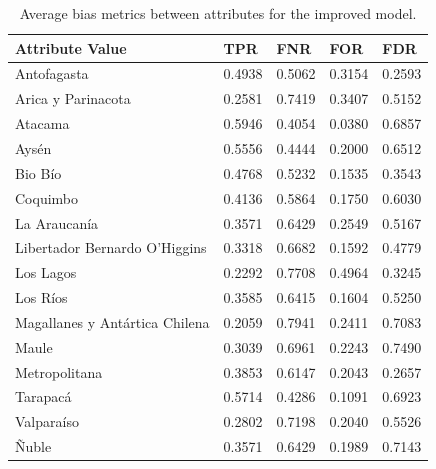 \documentclass[fleqn,10pt]{wlscirep}
\begin{document}
\begin{table}[!htb]
\centering
\begin{tabular}{|p{3.5cm}|p{1cm}|p{1cm}|p{1cm}|p{1cm}|}
\hline

        \textbf{Attribute Value} &  \textbf{TPR} &    \textbf{FNR} &      \textbf{FOR} &      \textbf{FDR} \\
\hline
                   Antofagasta & 0.4938 & 0.5062 &   0.3154 &   0.2593 \\
            Arica y Parinacota & 0.2581 & 0.7419 &   0.3407 &   0.5152 \\
                       Atacama & 0.5946 & 0.4054 &   0.0380 &   0.6857 \\
                         Aysén & 0.5556 & 0.4444 &   0.2000 &   0.6512 \\
                       Bio Bío & 0.4768 & 0.5232 &   0.1535 &   0.3543 \\
                      Coquimbo & 0.4136 & 0.5864 & 0.1750 &   0.6030 \\
                  La Araucanía & 0.3571 & 0.6429 &   0.2549 &   0.5167 \\
 Libertador Bernardo O'Higgins & 0.3318 & 0.6682 &   0.1592 &   0.4779 \\
                     Los Lagos & 0.2292 & 0.7708 &   0.4964 &   0.3245 \\
                      Los Ríos & 0.3585 & 0.6415 &   0.1604 & 0.5250 \\
Magallanes y Antártica Chilena & 0.2059 & 0.7941 &   0.2411 &   0.7083 \\
                         Maule & 0.3039 & 0.6961 &   0.2243 &   0.7490 \\
                 Metropolitana & 0.3853 & 0.6147 &   0.2043 &   0.2657 \\
                      Tarapacá & 0.5714 & 0.4286 &   0.1091 &   0.6923 \\
                    Valparaíso & 0.2802 & 0.7198 &   0.2040 &   0.5526 \\
                         Ñuble & 0.3571 & 0.6429 &   0.1989 &   0.7143 \\

\hline
\end{tabular}
\caption{Average bias metrics between attributes for the improved model.}
\label{tab_region_hfalta_opt:}
\end{table}
\end{document}
